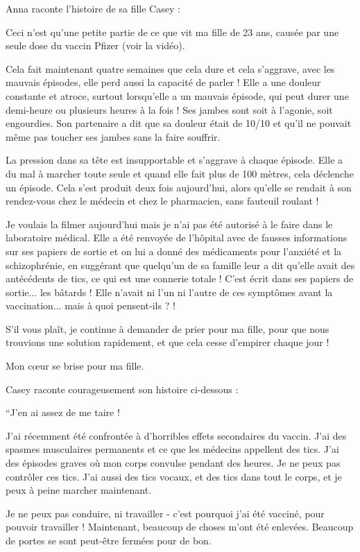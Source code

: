 Anna raconte l'histoire de sa fille Casey :

Ceci n'est qu'une petite partie de ce que vit ma fille de 23 ans, causée par une
seule dose du vaccin Pfizer (voir la vidéo).

Cela fait maintenant quatre semaines que cela dure et cela s'aggrave, avec les
mauvais épisodes, elle perd aussi la capacité de parler ! Elle a une douleur
constante et atroce, surtout lorsqu'elle a un mauvais épisode, qui peut durer
une demi-heure ou plusieurs heures à la fois ! Ses jambes sont soit à l'agonie,
soit engourdies. Son partenaire a dit que sa douleur était de 10/10 et qu'il ne
pouvait même pas toucher ses jambes sans la faire souffrir.

La pression dans sa tête est insupportable et s'aggrave à chaque épisode. Elle a
du mal à marcher toute seule et quand elle fait plus de 100 mètres, cela
déclenche un épisode. Cela s'est produit deux fois aujourd'hui, alors qu'elle se
rendait à son rendez-vous chez le médecin et chez le pharmacien, sans fauteuil
roulant !

Je voulais la filmer aujourd'hui mais je n'ai pas été autorisé à le faire dans
le laboratoire médical. Elle a été renvoyée de l'hôpital avec de fausses
informations sur ses papiers de sortie et on lui a donné des médicaments pour
l'anxiété et la schizophrénie, en suggérant que quelqu'un de sa famille leur a
dit qu'elle avait des antécédents de tics, ce qui est une connerie totale !
C'est écrit dans ses papiers de sortie... les bâtards ! Elle n'avait ni l'un ni
l'autre de ces symptômes avant la vaccination... mais à quoi pensent-ils ? !

S'il vous plaît, je continue à demander de prier pour ma fille, pour que nous
trouvions une solution rapidement, et que cela cesse d'empirer chaque jour !

Mon cœur se brise pour ma fille.

Casey raconte courageusement son histoire ci-dessous :

``J'en ai assez de me taire !

J'ai récemment été confrontée à d'horribles effets secondaires du vaccin. J'ai
des spasmes musculaires permanents et ce que les médecins appellent des
tics. J'ai des épisodes graves où mon corps convulse pendant des heures. Je ne
peux pas contrôler ces tics. J'ai aussi des tics vocaux, et des tics dans tout
le corps, et je peux à peine marcher maintenant.

Je ne peux pas conduire, ni travailler - c'est pourquoi j'ai été vacciné, pour
pouvoir travailler ! Maintenant, beaucoup de choses m'ont été enlevées. Beaucoup
de portes se sont peut-être fermées pour de bon.

